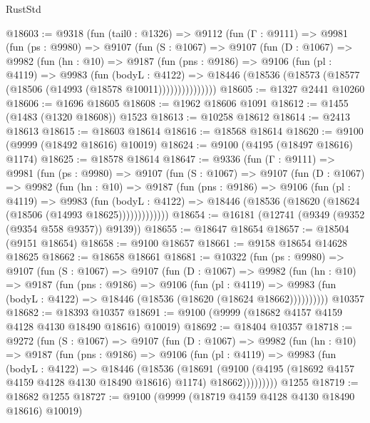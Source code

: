 \begin{lexlean}{RustStd}
\begin{coremodule}
@18603 := @9318
    (fun (tail0 : @1326) =>
    @9112
      (fun (Γ : @9111) =>
      @9981
        (fun (ps : @9980) =>
        @9107
          (fun (S : @1067) =>
          @9107
            (fun (D : @1067) =>
            @9982
              (fun (hn : @10) =>
              @9187
                (fun (pns : @9186) =>
                @9106
                  (fun (pl : @4119) =>
                  @9983
                    (fun (bodyL : @4122) =>
                    @18446 (@18536 (@18573 (@18577 (@18506 (@14993 (@18578 @10011)))))))))))))))
@18605 := @1327 @2441 @10260
@18606 := @1696 @18605
@18608 := @1962 @18606 @1091
@18612 := @1455 (@1483 (@1320 @18608)) @1523
@18613 := @10258 @18612
@18614 := @2413 @18613
@18615 := @18603 @18614
@18616 := @18568 @18614
@18620 := @9100 (@9999 (@18492 @18616) @10019)
@18624 := @9100 (@4195 (@18497 @18616) @1174)
@18625 := @18578 @18614
@18647 := @9336
    (fun (Γ : @9111) =>
    @9981
      (fun (ps : @9980) =>
      @9107
        (fun (S : @1067) =>
        @9107
          (fun (D : @1067) =>
          @9982
            (fun (hn : @10) =>
            @9187
              (fun (pns : @9186) =>
              @9106
                (fun (pl : @4119) =>
                @9983
                  (fun (bodyL : @4122) =>
                  @18446 (@18536 (@18620 (@18624 (@18506 (@14993 @18625)))))))))))))
@18654 := @16181 (@12741 (@9349 (@9352 (@9354 @558 @9357)) @9139))
@18655 := @18647 @18654
@18657 := @18504 (@9151 @18654)
@18658 := @9100 @18657
@18661 := @9158 @18654 @14628 @18625
@18662 := @18658 @18661
@18681 := @10322
    (fun (ps : @9980) =>
    @9107
      (fun (S : @1067) =>
      @9107
        (fun (D : @1067) =>
        @9982
          (fun (hn : @10) =>
          @9187
            (fun (pns : @9186) =>
            @9106
              (fun (pl : @4119) =>
              @9983 (fun (bodyL : @4122) => @18446 (@18536 (@18620 (@18624 @18662))))))))))
    @10357
@18682 := @18393 @10357
@18691 := @9100 (@9999 (@18682 @4157 @4159 @4128 @4130 @18490 @18616) @10019)
@18692 := @18404 @10357
@18718 := @9272
    (fun (S : @1067) =>
    @9107
      (fun (D : @1067) =>
      @9982
        (fun (hn : @10) =>
        @9187
          (fun (pns : @9186) =>
          @9106
            (fun (pl : @4119) =>
            @9983
              (fun (bodyL : @4122) =>
              @18446
                (@18536
                  (@18691
                    (@9100
                      (@4195 (@18692 @4157 @4159 @4128 @4130 @18490 @18616) @1174)
                      @18662)))))))))
    @1255
@18719 := @18682 @1255
@18727 := @9100 (@9999 (@18719 @4159 @4128 @4130 @18490 @18616) @10019)

\end{coremodule}
\end{lexlean}
